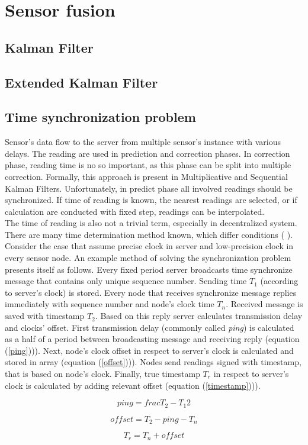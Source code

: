 \chapter{Sensor fusion}



\section{Kalman Filter}

\section{Extended Kalman Filter}

\section{Time synchronization problem}

Sensor's data flow to the server from multiple sensor's instance with various delays. The reading are used in prediction and correction phases. In correction phase, reading time is no so important, as this phase can be split into multiple correction. Formally, this approach is present in Multiplicative and Sequential Kalman Filters. Unfortunately, in predict phase all involved readings should be synchronized. If time of reading is known, the nearest readings are selected, or if calculation are conducted with fixed step, readings can be interpolated.\\

The time of reading is also not a trivial term, especially in decentralized system. There are many time determination method known, which differ conditions (\cite{time_sync} \cite{time_sync2}). Consider the case that assume precise clock in server and low-precision clock in every sensor node. An example method of solving the synchronization problem presents itself as follows. Every fixed period server broadcasts time synchronize message that contains only unique sequence number. Sending time $T_1$ (according to server's clock) is stored. Every node that receives synchronize message replies immediately with sequence number and node's clock time $T_n$. Received message is saved with timestamp $T_2$. Based on this reply server calculates transmission delay and clocks' offset. First transmission delay (commonly called \textit{ping}) is calculated as a half of a period between broadcasting message and receiving reply (equation (\ref{ping}))). Next, node's clock offset in respect to server's clock is calculated and stored in array (equation (\ref{offset}))). Nodes send readings signed with timestamp, that is based on node's clock. Finally, true timestamp $T_r$ in respect to server's clock is calculated by adding relevant offset (equation (\ref{timestamp}))).

\begin{equation}
	ping = frac{T_2 - T_1}{2}
	\label{ping}
\end{equation}

\begin{equation}
	offset = T_2 - ping - T_n
	\label{offset}
\end{equation}

\begin{equation}
	T_r = T_n + offset
	\label{timestamp}
\end{equation}